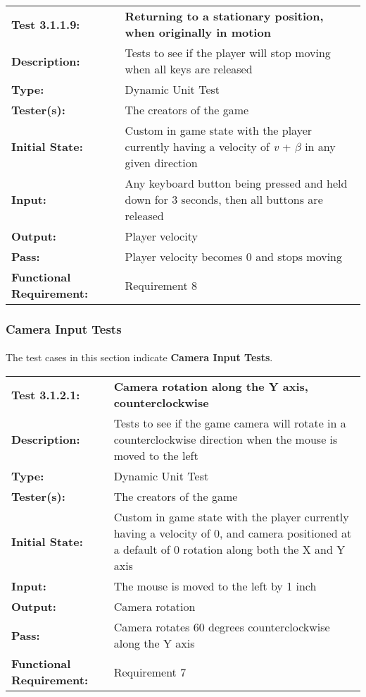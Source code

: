 \documentclass[12pt, titlepage]{article}
\begin{document}
\begin{mdframed}[linewidth=1pt]
\begin{tabularx}{\textwidth}{@{}p{3cm}X@{}}
{\bf Test 3.1.1.9:} & {\bf Returning to a stationary position, when originally in motion}\\[\baselineskip]
{\bf Description:} & Tests to see if the player will stop moving when all keys are released\\[0.5\baselineskip]
{\bf Type:} & Dynamic Unit Test\\[0.5\baselineskip]
{\bf Tester(s):} & The creators of the game\\[0.5\baselineskip]
{\bf Initial State:} & Custom in game state with the player currently having a velocity of \textit{v} + $\beta$ in any given direction\\[0.5\baselineskip]
{\bf Input:} & Any keyboard button being pressed and held down for 3 seconds, then all buttons are released \\[0.5\baselineskip]
{\bf Output:} & Player velocity\\[0.5\baselineskip]
{\bf Pass:} & Player velocity becomes 0 and stops moving \\[0.5\baselineskip]
{\bf Functional Requirement:} & Requirement 8
\end{tabularx}
\end{mdframed}

\subsubsection{Camera Input Tests}
\paragraph{}The test cases in this section indicate \textbf{Camera Input Tests}.

\begin{mdframed}[linewidth=1pt]
\begin{tabularx}{\textwidth}{@{}p{3cm}X@{}}
{\bf Test 3.1.2.1:} & {\bf Camera rotation along the Y axis, counterclockwise}\\[\baselineskip]
{\bf Description:} & Tests to see if the game camera will rotate in a counterclockwise direction when the mouse is moved to the left\\[0.5\baselineskip]
{\bf Type:} & Dynamic Unit Test\\[0.5\baselineskip]
{\bf Tester(s):} & The creators of the game\\[0.5\baselineskip]
{\bf Initial State:} & Custom in game state with the player currently having a velocity of 0, and camera positioned at a default of 0 rotation along both the X and Y axis\\[0.5\baselineskip]
{\bf Input:} & The mouse is moved to the left by 1 inch\\[0.5\baselineskip]
{\bf Output:} & Camera rotation\\[0.5\baselineskip]
{\bf Pass:} & Camera rotates 60 degrees counterclockwise along the Y axis \\[0.5\baselineskip]
{\bf Functional Requirement:} & Requirement 7
\end{tabularx}
\end{mdframed}
\end{document}
